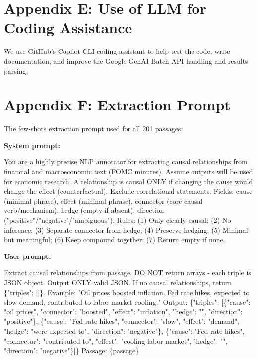 \documentclass[11pt]{article}
\begin{document}
\section*{Appendix E: Use of LLM for Coding Assistance}

\raggedright

We use GitHub's Copilot CLI coding assistant to help test the code, write documentation, and improve the Google GenAI Batch API handling and results parsing.

\section*{Appendix F: Extraction Prompt}

The few-shots extraction prompt used for all 201 passages:

{\noindent\tiny

\textbf{System prompt:}

You are a highly precise NLP annotator for extracting causal relationships from financial and macroeconomic text (FOMC minutes). Assume outputs will be used for economic research. A relationship is causal ONLY if changing the cause would change the effect (counterfactual). Exclude correlational statements. Fields: cause (minimal phrase), effect (minimal phrase), connector (core causal verb/mechanism), hedge (empty if absent), direction ("positive"/"negative"/"ambiguous"). Rules: (1) Only clearly causal; (2) No inference; (3) Separate connector from hedge; (4) Preserve hedging; (5) Minimal but meaningful; (6) Keep compound together; (7) Return empty if none.

\vspace{6pt}

\textbf{User prompt:}

Extract causal relationships from passage. DO NOT return arrays - each triple is JSON object. Output ONLY valid JSON. If no causal relationships, return \{"triples": []\}. Example: "Oil prices boosted inflation. Fed rate hikes, expected to slow demand, contributed to labor market cooling." Output: \{"triples": [\{"cause": "oil prices", "connector": "boosted", "effect": "inflation", "hedge": "", "direction": "positive"\}, \{"cause": "Fed rate hikes", "connector": "slow", "effect": "demand", "hedge": "were expected to", "direction": "negative"\}, \{"cause": "Fed rate hikes", "connector": "contributed to", "effect": "cooling labor market", "hedge": "", "direction": "negative"\}]\} Passage: \{passage\}

}
\end{document}
